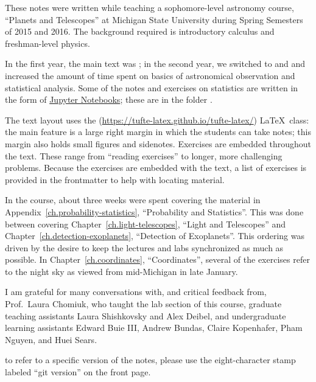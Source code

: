 
These notes were written while teaching a sophomore-level astronomy course, ``Planets and Telescopes'' at Michigan State University during Spring Semesters of 2015 and 2016. The background required is  introductory calculus and freshman-level physics.

In the first year, the main text was ; in the second year, we switched to  and  and increased the amount of time spent on basics of astronomical observation and statistical analysis. Some of the notes and exercises on statistics are written in the form of \href{http://jupyter.org}{Jupyter Notebooks}; these are in the folder .

The text layout uses the  (\url{https://tufte-latex.github.io/tufte-latex/}) \LaTeX\ class:  the main feature is a large right margin in which the students can take notes; this margin also holds small figures and sidenotes. Exercises are embedded throughout the text.  These range from ``reading exercises'' to longer, more challenging problems.  Because the exercises are embedded with the text, a list of exercises is provided in the frontmatter to help with locating material.

In the course, about three weeks were spent covering the material in Appendix~\ref{ch.probability-statistics}, ``Probability and Statistics''.  This was done between covering Chapter~\ref{ch.light-telescopes}, ``Light and Telescopes'' and Chapter~\ref{ch.detection-exoplanets}, ``Detection of Exoplanets''.  This ordering was driven by the desire to keep the lectures and labs synchronized as much as possible. In Chapter~\ref{ch.coordinates}, ``Coordinates'', several of the exercises refer to the night sky as viewed from mid-Michigan in late January.

I am grateful for many conversations with, and critical feedback from,  Prof.~Laura Chomiuk, who taught the lab section of this course, graduate teaching assistants Laura Shishkovsky and Alex Deibel, and undergraduate learning assistants Edward Buie III, Andrew Bundas, Claire Kopenhafer, Pham Nguyen, and Huei Sears. 

 to refer to a specific version of the notes, please use the eight-character stamp labeled ``git version'' on the front page.
